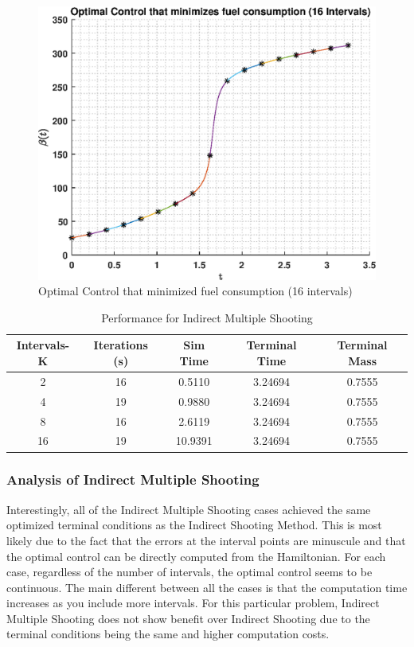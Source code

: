 \documentclass[]{article}
\begin{document}
\begin{figure}
	\centering
	\includegraphics[scale=0.75]{indirectMultiControl16.eps}
	\caption{Optimal Control that minimized fuel consumption (16 intervals)}
	\label{fig:indirectMultiControl16}
\end{figure}
\begin{table}
    \centering
	\begin{tabular}{||c c c c c||} 
		\hline
		Intervals-K & Iterations (s) & Sim Time & Terminal Time & Terminal Mass\\ [0.5ex] 
		\hline\hline
		2           & 16            & 0.5110     &   3.24694      & 0.7555\\
		\hline
		4           & 19            & 0.9880     &   3.24694      & 0.7555\\ 
		\hline
		8           & 16            & 2.6119     &   3.24694      & 0.7555\\ 
		\hline
		16          & 19            & 10.9391    &   3.24694      & 0.7555\\ [1ex]
		\hline
	\end{tabular}
\caption{Performance for Indirect Multiple Shooting}
\label{table:2}
\end{table}

\subsubsection{Analysis of Indirect Multiple Shooting}
Interestingly, all of the Indirect Multiple Shooting cases achieved the same optimized terminal conditions as the Indirect Shooting Method. This is most likely due to the fact that the errors at the interval points are minuscule and that the optimal control can be directly computed from the Hamiltonian. For each case, regardless of the number of intervals, the optimal control seems to be continuous. The main different between all the cases is that the computation time increases as you include more intervals. For this particular problem, Indirect Multiple Shooting does not show benefit over Indirect Shooting due to the terminal conditions being the same and higher computation costs.
\FloatBarrier
\end{document}
